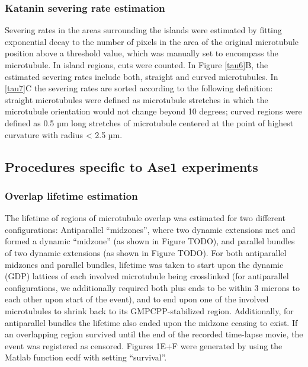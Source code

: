 \subsubsection{Katanin severing rate estimation} 
Severing rates in the areas surrounding the islands were estimated by fitting exponential decay to the number of pixels in the area of the original microtubule position above a threshold value, which was manually set to encompass the microtubule. In island regions, cuts were counted. In Figure \ref{tau6}B, the estimated severing rates include both, straight and curved microtubules. In \ref{tau7}C the severing rates are sorted according to the following definition: straight microtubules were defined as microtubule stretches in which the microtubule orientation would not change beyond 10 degrees; curved regions were defined as 0.5 µm long stretches of microtubule centered at the point of highest curvature with radius < 2.5 µm.

\subsection{Procedures specific to Ase1 experiments}
\subsubsection{Overlap lifetime estimation}
The lifetime of regions of microtubule overlap was estimated for two different configurations: Antiparallel “midzones”, where two dynamic extensions met and formed a dynamic “midzone” (as shown in Figure TODO), and parallel bundles of two dynamic extensions (as shown in Figure TODO). For both antiparallel midzones and parallel bundles, lifetime was taken to start upon the dynamic (GDP) lattices of each involved microtubule being crosslinked (for antiparallel configurations, we additionally required both plus ends to be within 3 microns to each other upon start of the event), and to end upon one of the involved microtubules to shrink back to its GMPCPP-stabilized region. Additionally, for antiparallel bundles the lifetime also ended upon the midzone ceasing to exist. If an overlapping region survived until the end of the recorded time-lapse movie, the event was registered as censored. Figures 1E+F were generated by using the Matlab function ecdf with setting “survival”.

